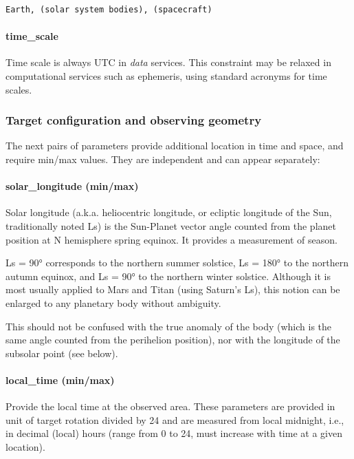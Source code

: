 \documentclass[11pt,a4paper]{ivoa}
\begin{document}
\begin{verbatim}
Earth, (solar system bodies), (spacecraft)
\end{verbatim}

\paragraph{time\_scale}

Time scale is always UTC in \emph{data} services. This constraint may be relaxed in computational services such as ephemeris, using standard acronyms for time scales.

\subsubsection{Target configuration and observing geometry}

The next pairs of parameters provide additional location in time and space, and require min/max values. They are independent and can appear separately:

\paragraph{solar\_longitude (min/max)}

Solar longitude (a.k.a. heliocentric longitude, or ecliptic longitude of the Sun, traditionally noted Ls) is the Sun-Planet vector angle counted from the planet position at N hemisphere spring equinox. It provides a measurement of season.

Ls = 90° corresponds to the northern summer solstice, Ls = 180° to the northern autumn equinox, and Ls = 90° to the northern winter solstice. Although it is most usually applied to Mars and Titan (using Saturn's Ls), this notion can be enlarged to any planetary body without ambiguity.

This should not be confused with the true anomaly of the body (which is the same angle counted from the perihelion position), nor with the longitude of the subsolar point (see below).

\paragraph{local\_time (min/max)}

Provide the local time at the observed area. These parameters are provided in unit of target rotation divided by 24 and are measured from local midnight, i.e., in decimal (local) hours (range from 0 to 24, must increase with time at a given location). 
\end{document}
